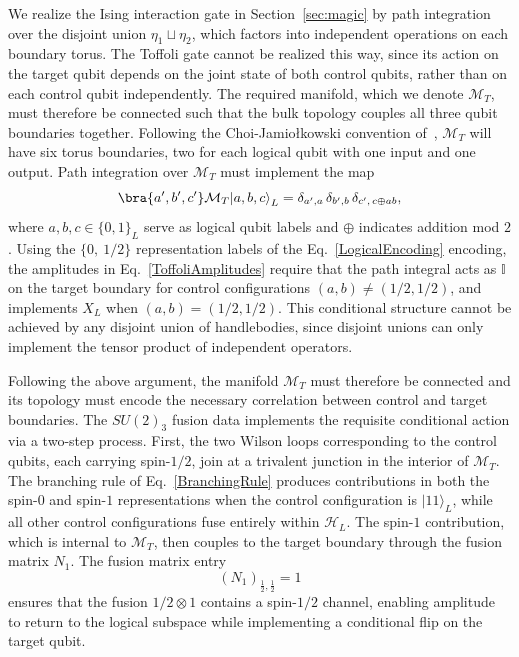 \documentclass[12pt,a4paper]{article}
\def\ket#1{{|{#1}\rangle}}
\begin{document}
We realize the Ising interaction gate in Section~\ref{sec:magic} by path integration over the disjoint union $\eta_1\sqcup\eta_2$, which factors into independent operations on each boundary torus. The Toffoli gate cannot be realized this way, since its action on the target qubit depends on the joint state of both control qubits, rather than on each control qubit independently. The required manifold, which we denote $\mathcal{M}_T$, must therefore be connected such that the bulk topology couples all three qubit boundaries together. Following the Choi-Jamio\l{}kowski convention of~\cite{Salton:2016qpp}, $\mathcal{M}_T$ will have six torus boundaries, two for each logical qubit with one input and one output. Path integration over $\mathcal{M}_T$ must implement the map
%
\begin{equation}\label{ToffoliAmplitudes}
\bra{a',b',c'}\mathcal{M}_T\ket{a,b,c}_L = \delta_{a',a}\,\delta_{b',b}\,\delta_{c',\, c\oplus ab},
\end{equation}
%
where $a, b, c \in \{0, 1\}_L$ serve as logical qubit labels and $\oplus$ indicates addition mod $2$. Using the $\{0,\ 1/2\}$ representation labels of the Eq.\ \eqref{LogicalEncoding} encoding, the amplitudes in Eq.\ \eqref{ToffoliAmplitudes} require that the path integral acts as $\mathbb{I}$ on the target boundary for control configurations $(a,b) \neq (1/2, 1/2)$, and implements $X_L$ when $(a,b) = (1/2, 1/2)$. This conditional structure cannot be achieved by any disjoint union of handlebodies, since disjoint unions can only implement the tensor product of independent operators. 

Following the above argument, the manifold $\mathcal{M}_T$ must therefore be connected and its topology must encode the necessary correlation between control and target boundaries. The $SU(2)_3$ fusion data implements the requisite conditional action via a two-step process. First, the two Wilson loops corresponding to the control qubits, each carrying spin-$1/2$, join at a trivalent junction in the interior of $\mathcal{M}_T$. The branching rule of Eq.\ \eqref{BranchingRule} produces contributions in both the spin-$0$ and spin-$1$ representations when the control configuration is $\ket{11}_L$, while all other control configurations fuse entirely within $\mathcal{H}_L$. The spin-$1$ contribution, which is internal to $\mathcal{M}_T$, then couples to the target boundary through the fusion matrix $N_1$. The fusion matrix entry
%
\begin{equation}\label{N1_entry}
(N_1)_{\frac{1}{2},\frac{1}{2}} = 1
\end{equation}
%
ensures that the fusion $1/2 \otimes 1$ contains a spin-$1/2$ channel, enabling amplitude to return to the logical subspace while implementing a conditional flip on the target qubit.
\end{document}
